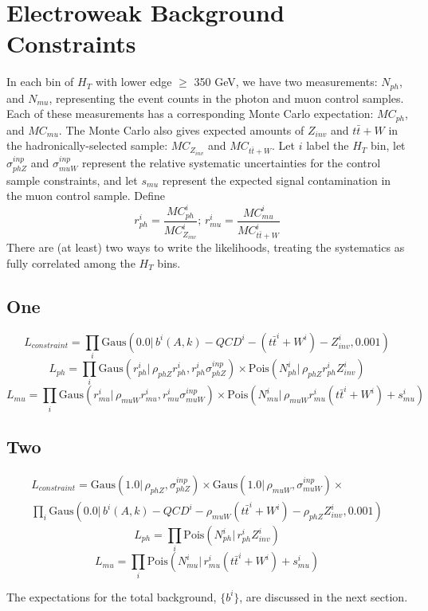 \section{Electroweak Background Constraints}
In each bin of $H_T$ with lower edge $\ge$ 350 GeV, we have two measurements: $N_{ph}$, and $N_{mu}$,
representing the event counts in the photon and muon control samples.  Each of these measurements has a 
corresponding Monte Carlo expectation: $MC_{ph}$, and $MC_{mu}$.  The Monte Carlo also gives
expected amounts of $Z_{inv}$ and $t\bar{t}+W$ in the hadronically-selected sample: $MC_{Z_{inv}}$ and $MC_{t\bar{t}+W}$.
Let $i$ label the $H_T$ bin, let $\sigma_{phZ}^{inp}$ and $\sigma_{muW}^{inp}$ represent the relative 
systematic uncertainties for the control sample constraints, and let $s_{mu}$ represent the expected signal contamination in the muon control sample.
Define 
\begin{equation}
r_{ph}^i = \frac{MC_{ph}^i}{MC_{Z_{inv}}^i};\, r_{mu}^i = \frac{MC_{mu}^i}{MC_{t\bar{t}+W}^i}
\end{equation}
There are (at least) two ways to write the likelihoods, treating the systematics as fully correlated among the $H_T$ bins.

\subsection{One}

\begin{equation}
L_{constraint}=\prod_i \mathrm{Gaus}( 0.0 |\, b^{i}(A,k)-QCD^{i}-(t\bar{t}^i+W^i) - Z_{inv}^{i}, 0.001)
\end{equation}
\begin{equation}
L_{ph}=\prod_i \mathrm{Gaus}( r_{ph}^i |\,\rho_{phZ} r_{ph}^i, r_{ph}^i \sigma_{phZ}^{inp}) \times \mathrm{Pois}(N_{ph}^i |\, \rho_{phZ} r_{ph}^{i} Z_{inv}^{i})
\end{equation}
\begin{equation}
L_{mu}=\prod_i \mathrm{Gaus}( r_{mu}^i |\,\rho_{muW} r_{mu}^i, r_{mu}^i \sigma_{muW}^{inp}) \times \mathrm{Pois}(N_{mu}^i |\, \rho_{muW} r_{mu}^{i} (t\bar{t}^i+W^i) + s_{mu}^i)
\end{equation}

\subsection{Two}
\begin{eqnarray*}
L_{constraint}=\mathrm{Gaus}( 1.0 |\,\rho_{phZ},\sigma_{phZ}^{inp}) \times \mathrm{Gaus}( 1.0 |\,\rho_{muW},\sigma_{muW}^{inp}) \times \\
{} \prod_i \mathrm{Gaus}( 0.0 |\, b^{i}(A,k) - QCD^{i} - \rho_{muW} (t\bar{t}^i+W^i) - \rho_{phZ} Z_{inv}^{i}, 0.001)
\end{eqnarray*}
\begin{equation}
L_{ph}= \prod_i \mathrm{Pois}(N_{ph}^i |\, r_{ph}^{i} Z_{inv}^{i})
\end{equation}
\begin{equation}
L_{mu}= \prod_i \mathrm{Pois}(N_{mu}^i |\, r_{mu}^{i} (t\bar{t}^i+W^i) + s_{mu}^i)
\end{equation}

The expectations for the total background,  $\{b^{i}\}$, are discussed in the next section.
